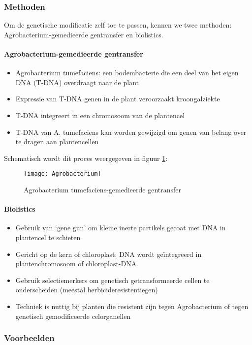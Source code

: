 \documentclass[a4paper,kul]{kulakarticle} %
\begin{document}
\subsubsection{Methoden}
Om de genetische modificatie zelf toe te passen, kennen we twee methoden: Agrobacterium-gemedieerde gentransfer en biolistics.
\paragraph{Agrobacterium-gemedieerde gentransfer}
\begin{itemize}
	\item Agrobacterium tumefaciens: een bodembacterie die een deel van het
	eigen DNA (T-DNA) overdraagt naar de plant
	\item Expressie van T-DNA genen in de plant veroorzaakt kroongalziekte
	\item T-DNA integreert in een chromosoom van de plantencel
	\item T-DNA van A. tumefaciens kan worden gewijzigd om genen van
	belang over te dragen aan plantencellen
\end{itemize}
Schematisch wordt dit proces weergegeven in figuur \ref{fig:agrobacterium}:
\begin{figure}[h]
	\centering
	\texttt{[image: Agrobacterium]}
	\caption[Agro bacerium]{Agrobacterium tumefaciens-gemedieerde gentransfer}
	\label{fig:agrobacterium}
\end{figure}
\paragraph{Biolistics}
\begin{itemize}
	\item Gebruik van `gene gun' om kleine inerte partikels
	gecoat met DNA in plantencel te schieten
	\item Gericht op de kern of chloroplast: DNA wordt
	geïntegreerd in plantenchromosoom of chloroplast-DNA
	\item Gebruik selectiemerkers om genetisch getransformeerde cellen te
	onderscheiden (meestal herbicideresistentiegen)
	\item Techniek is nuttig bij planten die resistent zijn
	tegen Agrobacterium of tegen genetisch
	gemodificeerde celorganellen
\end{itemize}
\subsubsection{Voorbeelden}
\end{document}
